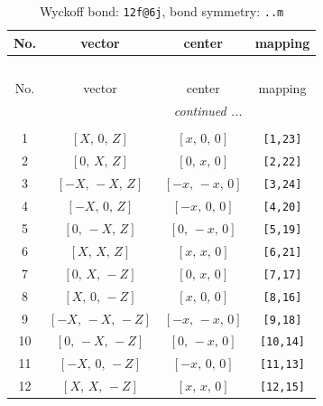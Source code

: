\documentclass[fleqn,8pt]{jsarticle}
\begin{document}
\begin{longtable}{cccc}
\caption{Wyckoff bond: {\tt 12f@6j}, bond symmetry: {\tt ..m}}
 \\
 \hline \hline
No. & vector & center & mapping \\ \hline \endfirsthead

\multicolumn{3}{l}{\tablename\ \thetable{}} \\
 \hline \hline
No. & vector & center & mapping \\ \hline \endhead

 \hline \hline
\multicolumn{3}{r}{\footnotesize\it continued ...} \\ \endfoot

 \hline \hline
\multicolumn{3}{r}{} \\ \endlastfoot

1 & $\left[ X,\, 0,\, Z \right]$ & $\left[ x,\, 0,\, 0 \right]$ & {\tt [1,23]} \\ \hline
2 & $\left[ 0,\, X,\, Z \right]$ & $\left[ 0,\, x,\, 0 \right]$ & {\tt [2,22]} \\ \hline
3 & $\left[ - X,\, - X,\, Z \right]$ & $\left[ - x,\, - x,\, 0 \right]$ & {\tt [3,24]} \\ \hline
4 & $\left[ - X,\, 0,\, Z \right]$ & $\left[ - x,\, 0,\, 0 \right]$ & {\tt [4,20]} \\ \hline
5 & $\left[ 0,\, - X,\, Z \right]$ & $\left[ 0,\, - x,\, 0 \right]$ & {\tt [5,19]} \\ \hline
6 & $\left[ X,\, X,\, Z \right]$ & $\left[ x,\, x,\, 0 \right]$ & {\tt [6,21]} \\ \hline
7 & $\left[ 0,\, X,\, - Z \right]$ & $\left[ 0,\, x,\, 0 \right]$ & {\tt [7,17]} \\ \hline
8 & $\left[ X,\, 0,\, - Z \right]$ & $\left[ x,\, 0,\, 0 \right]$ & {\tt [8,16]} \\ \hline
9 & $\left[ - X,\, - X,\, - Z \right]$ & $\left[ - x,\, - x,\, 0 \right]$ & {\tt [9,18]} \\ \hline
10 & $\left[ 0,\, - X,\, - Z \right]$ & $\left[ 0,\, - x,\, 0 \right]$ & {\tt [10,14]} \\ \hline
11 & $\left[ - X,\, 0,\, - Z \right]$ & $\left[ - x,\, 0,\, 0 \right]$ & {\tt [11,13]} \\ \hline
12 & $\left[ X,\, X,\, - Z \right]$ & $\left[ x,\, x,\, 0 \right]$ & {\tt [12,15]} \\
\end{longtable}
\renewcommand{\arraystretch}{1.2}
\end{document}
